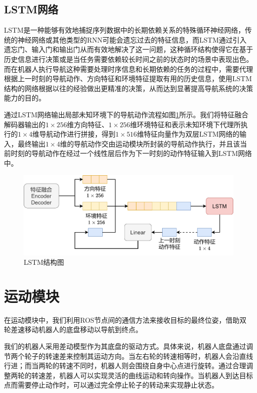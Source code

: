 \subsection{LSTM网络}
LSTM是一种能够有效地捕捉序列数据中的长期依赖关系的特殊循环神经网络，传统的神经网络或其他类型的RNN可能会遗忘过去的特征信息，而LSTM通过引入遗忘门、输入门和输出门从而有效地解决了这一问题，这种循环结构使得它在基于历史信息进行决策或是当任务需要依赖较长时间之前的状态时的场景中表现出色。而在机器人执行导航这种需要处理时序信息和长期依赖的任务的过程中，需要代理根据上一时刻的导航动作、方向特征和环境特征提取有用的历史信息，使用LSTM结构的网络根据以往的经验做出更精准的决策，从而达到显著提高导航系统的决策能力的目的。

通过LSTM网络输出局部未知环境下的导航动作流程如图\ref{LSTM}所示。我们将特征融合解码器输出的$1 \times 256$维方向特征、$1 \times 256$维环境特征和表示未知环境下代理所执行的$1 \times 4$维导航动作进行拼接，得到$1 \times 516$维特征向量作为双层LSTM网络的输入，最终输出$1 \times 4$维的导航动作交由运动模块所封装的导航动作执行，并且该当前时刻的导航动作在经过一个线性层后作为下一时刻的动作特征输入到LSTM网络中。
\begin{figure}[htbp]
    \centering
    \includegraphics[scale=0.10]{Fig/LSTM.png}
    \caption{\label{LSTM}LSTM结构图}
\end{figure}


\section{运动模块}
在运动模块中，我们利用ROS节点间的通信方法来接收目标的最终位姿，借助双轮差速移动机器人的底盘移动以导航到终点。

我们的机器人采用差动模型作为其底盘的驱动方式。具体来说，机器人底盘通过调节两个轮子的转速差来控制其运动方向。当左右轮的转速相等时，机器人会沿直线行进；而当两轮的转速不同时，机器人则会围绕自身中心点进行旋转。通过合理调整两轮的转速差，机器人可以实现灵活的曲线运动和转向操作。当机器人到达目标点而需要停止动作时，可以通过完全停止轮子的转动来实现静止状态。  

